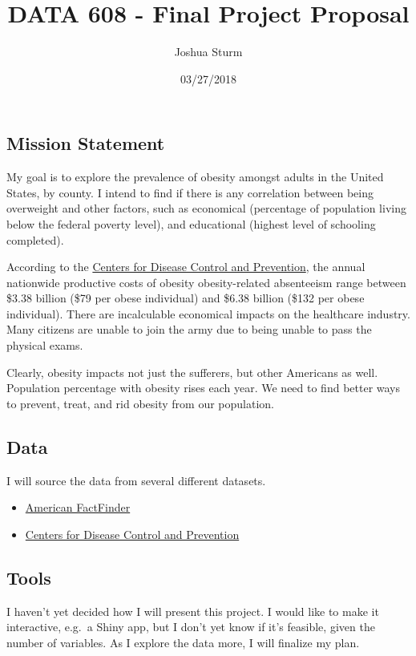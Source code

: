\documentclass[]{article}
\title{DATA 608 - Final Project Proposal}
\author{Joshua Sturm}
\date{03/27/2018}
\providecommand{\tightlist}{%
  \setlength{\itemsep}{0pt}\setlength{\parskip}{0pt}}
\begin{document}
\maketitle

\subsection{Mission Statement}\label{mission-statement}

My goal is to explore the prevalence of obesity amongst adults in the
United States, by county. I intend to find if there is any correlation
between being overweight and other factors, such as economical
(percentage of population living below the federal poverty level), and
educational (highest level of schooling completed).

According to the
\href{https://www.cdc.gov/obesity/adult/causes.html}{Centers for Disease
Control and Prevention}, the annual nationwide productive costs of
obesity obesity-related absenteeism range between \$3.38 billion (\$79
per obese individual) and \$6.38 billion (\$132 per obese individual).
There are incalculable economical impacts on the healthcare industry.
Many citizens are unable to join the army due to being unable to pass
the physical exams.

Clearly, obesity impacts not just the sufferers, but other Americans as
well. Population percentage with obesity rises each year. We need to
find better ways to prevent, treat, and rid obesity from our population.

\subsection{Data}\label{data}

I will source the data from several different datasets.

\begin{itemize}
\tightlist
\item
  \href{https://factfinder.census.gov/faces/nav/jsf/pages/index.xhtml}{American
  FactFinder}
\item
  \href{https://www.cdc.gov/diabetes/data/countydata/countydataindicators.html}{Centers
  for Disease Control and Prevention}
\end{itemize}

\subsection{Tools}\label{tools}

I haven't yet decided how I will present this project. I would like to
make it interactive, e.g.~a Shiny app, but I don't yet know if it's
feasible, given the number of variables. As I explore the data more, I
will finalize my plan.
\end{document}
